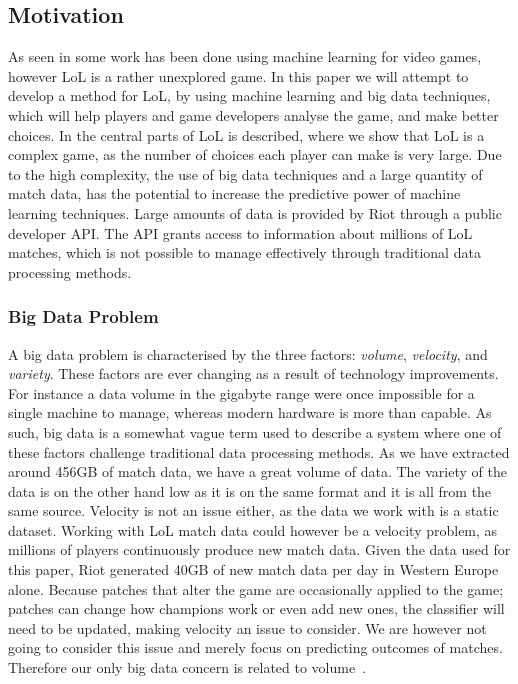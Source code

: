 \subsection{Motivation}\label{sec:motivation}
As seen in  some work has been done using machine learning for video games, however LoL is a rather unexplored game. 
In this paper we will attempt to develop a method for LoL, by using machine learning and big data techniques, which will help players and game developers analyse the game, and make better choices. In  the central parts of LoL is described, where we show that LoL is a complex game, as the number of choices each player can make is very large. Due to the high complexity, the use of big data techniques and a large quantity of match data, has the potential to increase the predictive power of machine learning techniques. Large amounts of data is provided by Riot through a public developer API. The API grants access to information about millions of LoL matches, which is not possible to manage effectively through traditional data processing methods.

\subsubsection{Big Data Problem}\label{sec:big_data_problem}
A big data problem is characterised by the three factors: \emph{volume}, \emph{velocity}, and \emph{variety}. These factors are ever changing as a result of technology improvements. For instance a data volume in the gigabyte range were once impossible for a single machine to manage, whereas modern hardware is more than capable. As such, big data is a somewhat vague term used to describe a system where one of these factors challenge traditional data processing methods. As we have extracted around 456GB of match data, we have a great volume of data. The variety of the data is on the other hand low as it is on the same format and it is all from the same source. Velocity is not an issue either, as the data we work with is a static dataset. Working with LoL match data could however be a velocity problem, as millions of players continuously produce new match data. Given the data used for this paper, Riot generated 40GB of new match data per day in Western Europe alone. Because patches that alter the game are occasionally applied to the game; patches can change how champions work or even add new ones, the classifier will need to be updated, making velocity an issue to consider. We are however not going to consider this issue and merely focus on predicting outcomes of matches. Therefore our only big data concern is related to volume~\cite{madden2012databases}.

